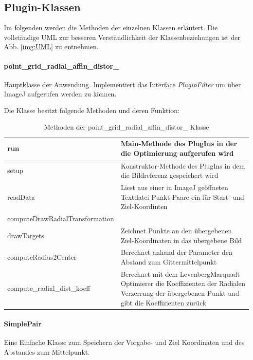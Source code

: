 \subsection{Plugin-Klassen}

Im folgenden werden die Methoden der einzelnen Klassen erläutert. Die vollständige UML zur besseren Verständlichkeit der Klassenbeziehungen ist der Abb. \ref{img:UML} zu entnehmen.

\paragraph{point\_grid\_radial\_affin\_distor\_}
Hauptklasse der Anwendung. Implementiert das Interface \emph{PluginFilter} um über ImageJ aufgerufen werden zu können.

Die Klasse besitzt folgende Methoden und deren Funktion:

\begin{table}[H]
	\begin{tabular}{|p{} | p{}|} 
		\hline
		run & Main-Methode des PlugIns in der die Optimierung aufgerufen wird\\ \hline
		setup & Konstruktor-Methode des PlugIns in dem die Bildreferenz gespeichert wird\\ \hline
		readData & Liest aus einer in ImageJ geöffneten Textdatei Punkt-Paare ein für Start- und Ziel-Koordinten\\\hline
		computeDrawRadialTransformation & \\ \hline
		drawTargets & Zeichnet Punkte an den übergebenen Ziel-Koordinaten in das übergebene Bild\\ \hline
		computeRadius2Center & Berechnet anhand der Parameter den Abstand zum Gittermittelpunkt\\ \hline
		compute\_radial\_dist\_koeff & Berechnet mit dem LevenbergMarquadt Optimierer die Koeffizienten der Radialen Verzerrung der übergebenen Punkt und gibt die Koeffizienten zurück\\ 
		\hline
	\end{tabular}
	\caption{Methoden der point\_grid\_radial\_affin\_distor\_ Klasse}
\end{table}

\paragraph{SimplePair}
Eine Einfache Klasse zum Speichern der Vorgabe- und Ziel Koordinaten und des Abstandes zum Mittelpunkt.

